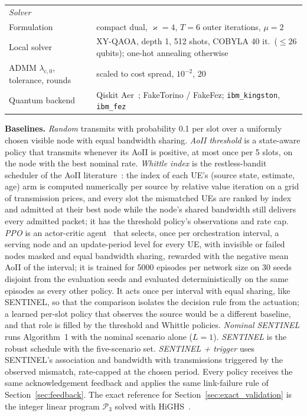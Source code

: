 \begin{table}[t]
\begin{tabular}{p{} p{}}
\hline
\multicolumn{2}{l}{\emph{Solver}} \\
Formulation & compact dual, $\varkappa=4$, $T=6$ outer iterations, $\mu=2$ \\
Local solver & XY-QAOA, depth 1, 512 shots, COBYLA 40 it.\ ($\le 26$ qubits); one-hot annealing otherwise \\
ADMM $\lambda_{\mathrm{c},0}$, tolerance, rounds & scaled to cost spread, $10^{-2}$, 20 \\
Quantum backend & Qiskit Aer~\cite{Qiskit2024}; FakeTorino / FakeFez; \texttt{ibm\_kingston}, \texttt{ibm\_fez} \\
\hline
\end{tabular}
\end{table}

\textbf{Baselines.} \emph{Random} transmits with probability 0.1 per slot over a uniformly chosen visible node with
equal bandwidth sharing. \emph{AoII threshold} is a state-aware policy that transmits whenever its AoII is positive,
at most once per 5 slots, on the node with the best nominal rate. \emph{Whittle index} is the restless-bandit
scheduler of the AoII literature~\cite{Whittle1988, Kadota2018}: the index of each UE's (source state, estimate, age)
arm is computed numerically per source by relative value iteration on a grid of transmission prices, and every slot
the mismatched UEs are ranked by index and admitted at their best node while the node's shared bandwidth still
delivers every admitted packet; it has the threshold policy's observations and rate cap. \emph{PPO} is an actor-critic
agent~\cite{Schulman2017} that selects, once per orchestration interval, a serving node and an update-period level for
every UE, with invisible or failed nodes masked and equal bandwidth sharing, rewarded with the negative mean AoII of
the interval; it is trained for 5000 episodes per network size on 30 seeds disjoint from the evaluation seeds and
evaluated deterministically on the same episodes as every other policy. It acts once per interval with equal
sharing, like SENTINEL, so that the comparison isolates the decision rule from the actuation; a learned per-slot
policy that observes the source would be a different baseline, and that role is filled by the threshold and
Whittle policies. \emph{Nominal SENTINEL} runs Algorithm~1
with the nominal scenario alone ($L=1$). \emph{SENTINEL} is the robust schedule with the five-scenario set. \emph{SENTINEL
+ trigger} uses SENTINEL's association and bandwidth with transmissions triggered by the observed mismatch,
rate-capped at the chosen period. Every policy receives the same acknowledgement feedback and applies the same
link-failure rule of Section~\ref{sec:feedback}. The exact reference for Section~\ref{sec:exact_validation} is the integer linear program
$\mathscr{P}_3$ solved with HiGHS~\cite{HiGHS2018}.

